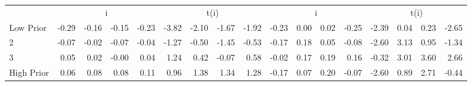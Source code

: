 \begin{table}[!ht]
\begin{tabular}{lrrrrrrrrrrrrrrrr}
  
     & \multicolumn{4}{c}{i} & \multicolumn{4}{c}{t(i)}  & \multicolumn{4}{c}{i} & \multicolumn{4}{c}{t(i)}   \\
     \cmidrule(r){2-5} \cmidrule(r){6-9}  \cmidrule(r){10-13} \cmidrule(r){14-17} 
    Low Prior  & -0.29  & -0.16  & -0.15  & -0.23  & -3.82  & -2.10  & -1.67  & -1.92  & -0.23  & 0.00  & 0.02  & -0.25  & -2.39  & 0.04  & 0.23  & -2.65   \\
    2  & -0.07  & -0.02  & -0.07  & -0.04  & -1.27  & -0.50  & -1.45  & -0.53  & -0.17  & 0.18  & 0.05  & -0.08  & -2.60  & 3.13  & 0.95  & -1.34   \\
    3  & 0.05  & 0.02  & -0.00  & 0.04  & 1.24  & 0.42  & -0.07  & 0.58  & -0.02  & 0.17  & 0.19  & 0.16  & -0.32  & 3.01  & 3.60  & 2.66   \\
    High Prior  & 0.06  & 0.08  & 0.08  & 0.11  & 0.96  & 1.38  & 1.34  & 1.28  & -0.17  & 0.07  & 0.20  & -0.07  & -2.60  & 0.89  & 2.71  & -0.44   \\
    
    
  
  \bottomrule
\end{tabular}
\label{tbl:Size_BMm_Prior}
\end{table}
